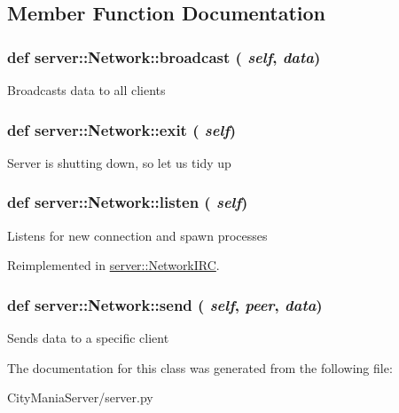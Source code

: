 \subsection{Member Function Documentation}
\hypertarget{classserver_1_1Network_acc3f7a604bfde9cbafb300b693593993}{
\subsubsection[{broadcast}]{\setlength{\rightskip}{0pt plus 5cm}def server::Network::broadcast ( {\em self}, \/   {\em data})}}
\label{classserver_1_1Network_acc3f7a604bfde9cbafb300b693593993}
\begin{DoxyVerb}
Broadcasts data to all clients 
\end{DoxyVerb}
 \hypertarget{classserver_1_1Network_a638b4611a8e77862e8b974848dc775e5}{
\subsubsection[{exit}]{\setlength{\rightskip}{0pt plus 5cm}def server::Network::exit ( {\em self})}}
\label{classserver_1_1Network_a638b4611a8e77862e8b974848dc775e5}
\begin{DoxyVerb}
Server is shutting down, so let us tidy up
\end{DoxyVerb}
 \hypertarget{classserver_1_1Network_a981b8652a76e0bba27263690fcdf9a62}{
\subsubsection[{listen}]{\setlength{\rightskip}{0pt plus 5cm}def server::Network::listen ( {\em self})}}
\label{classserver_1_1Network_a981b8652a76e0bba27263690fcdf9a62}
\begin{DoxyVerb}
Listens for new connection and spawn processes
\end{DoxyVerb}
 

Reimplemented in \hyperlink{classserver_1_1NetworkIRC_ae45074cb1b23332c54b323d5304d5512}{server::NetworkIRC}.\hypertarget{classserver_1_1Network_ab10936565ca90ef460d5497ac40a4618}{
\subsubsection[{send}]{\setlength{\rightskip}{0pt plus 5cm}def server::Network::send ( {\em self}, \/   {\em peer}, \/   {\em data})}}
\label{classserver_1_1Network_ab10936565ca90ef460d5497ac40a4618}
\begin{DoxyVerb}
Sends data to a specific client
\end{DoxyVerb}
 

The documentation for this class was generated from the following file:\begin{DoxyCompactItemize}
\item 
CityManiaServer/server.py\end{DoxyCompactItemize}
